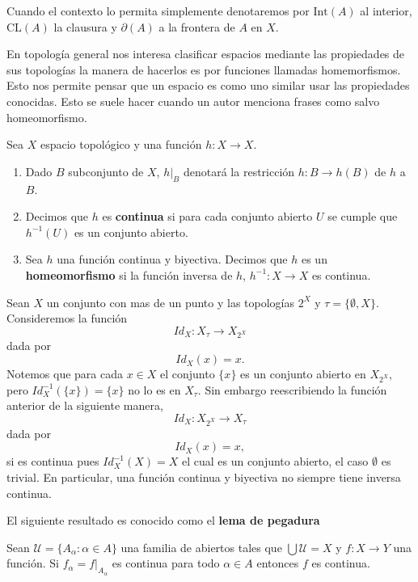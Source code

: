 \begin{cn}
Cuando el contexto lo permita simplemente denotaremos por $\mathrm{Int}(A)$ al interior, $\mathrm{CL}(A)$ la clausura y  $\partial(A)$ a la frontera de $A$ en $X$.
\end{cn}


En topología general nos interesa clasificar espacios mediante las propiedades de sus topologías la manera de hacerlos es por funciones llamadas homemorfismos. Esto nos permite pensar que un espacio es como uno similar usar las propiedades conocidas. Esto se suele hacer cuando un autor menciona frases como salvo homeomorfismo.

\begin{df}
Sea $X$ espacio topológico y una función $h:X \to X$. 
\begin{enumerate}

	\item Dado $B$ subconjunto de $X$, $h|_B$ denotará la restricción $h:B \to h(B)$ de $h$ a $B$. 
	
	\item  Decimos que $h$ es \textbf{continua} si para cada conjunto abierto $U$ se cumple que $h^{-1}(U)$ es un conjunto abierto.
	
	\item  Sea $h$ una función continua y biyectiva. Decimos que $h$ es un \textbf{homeomorfismo} si la función inversa de $h$, $h^{-1}:X \to X$ es continua. 	
\end{enumerate}
\end{df}


\begin{ej}
Sean $X$ un conjunto con mas de un punto y las topologías $2^X$ y $\tau=\{\emptyset, X\}$. Consideremos la función $$Id_X:X_{\tau} \to X_{2^X}$$ dada por $$Id_X(x)=x.$$
Notemos que para cada $x \in X$ el conjunto $\{x\}$ es un conjunto abierto en $X_{2^X}$, pero $Id_X^{-1}(\{x\})= \{x\}$ no lo es en $X_\tau$. Sin embargo reescribiendo  la función anterior de la siguiente manera,  $$Id_X:X_{2^X} \to X_{\tau}$$ dada por $$Id_X(x)=x,$$
si es continua pues $Id_X^{-1}(X)=X$ el cual es un conjunto abierto, el caso $\emptyset$ es trivial. En particular, una función continua y biyectiva no siempre tiene inversa continua. 
\end{ej}

El siguiente resultado es conocido como el \textbf{lema de pegadura}

\begin{pr}
Sean $\mathcal{U}= \{A_\alpha :\alpha \in A\}$ una familia de abiertos tales que $\bigcup \mathcal{U} = X$ y $f:X \to Y$ una función. Si $f_\alpha=f|_{A_\alpha}$ es continua para todo $\alpha \in A$ entonces $f$ es continua.  
\end{pr}

